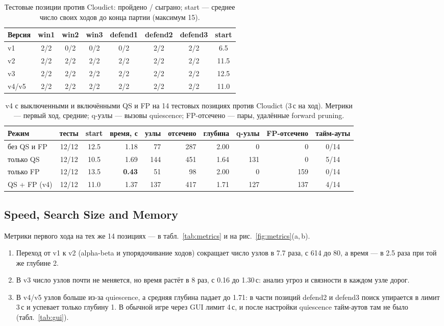 \documentclass[a4paper,10pt,twocolumn]{article}
\newenvironment{points}{\begin{enumerate}[label=(\arabic*),leftmargin=*,itemsep=2pt,topsep=3pt]}{\end{enumerate}}
\begin{document}
\begin{table}[t]
\centering
\caption{Тестовые позиции против Cloudict: пройдено / сыграно; start --- среднее число своих ходов до конца партии (максимум 15).}
\label{tab:battery}
\begin{tabular}{@{}lcccccc|c@{}}
\toprule
Версия & win1 & win2 & win3 & defend1 & defend2 & defend3 & start \\
\midrule
v1 & 2/2 & \cellcolor{red!12}0/2 & \cellcolor{red!12}0/2 & \cellcolor{red!12}0/2 & 2/2 & 2/2 & 6.5 \\
v2 & 2/2 & 2/2 & 2/2 & 2/2 & 2/2 & 2/2 & 11.5 \\
v3 & 2/2 & 2/2 & 2/2 & 2/2 & 2/2 & 2/2 & 12.5 \\
v4/v5 & 2/2 & 2/2 & 2/2 & 2/2 & 2/2 & 2/2 & 11.0 \\
\bottomrule
\end{tabular}
\end{table}

\begin{table}[t]
\centering
\caption{v4 с выключенными и включёнными QS и FP на 14 тестовых позициях против Cloudict (3\,с на ход). Метрики --- первый ход, средние; q-узлы --- вызовы quiescence; FP-отсечено --- пары, удалённые forward pruning.}
\label{tab:ablation}
\begin{tabular}{@{}lccrrrrrrc@{}}
\toprule
Режим & тесты & start & время, с & узлы & отсечено & глубина & q-узлы & FP-отсечено & тайм-ауты \\
\midrule
без QS и FP & 12/12 & 12.5 & 1.18 & 77 & 287 & 2.00 & 0 & 0 & 0/14 \\
только QS & 12/12 & 10.5 & 1.69 & 144 & 451 & 1.64 & 131 & 0 & 5/14 \\
только FP & 12/12 & 13.5 & \textbf{0.43} & 51 & 98 & 2.00 & 0 & 159 & 0/14 \\
QS + FP (v4) & 12/12 & 11.0 & 1.37 & 137 & 417 & 1.71 & 127 & 137 & 4/14 \\
\bottomrule
\end{tabular}
\end{table}

\subsection{Speed, Search Size and Memory}\label{sec:speed}
Метрики первого хода на тех же 14 позициях --- в табл.~\ref{tab:metrics} и на рис.~\ref{fig:metrics}(a,\,b).
\begin{points}
\item Переход от v1 к v2 (alpha-beta и упорядочивание ходов) сокращает число узлов в 7.7 раза, с 614 до 80, а время --- в 2.5 раза при той же глубине 2.
\item В v3 число узлов почти не меняется, но время растёт в 8 раз, с 0.16 до 1.30\,с: анализ угроз и связности в каждом узле дорог.
\item В v4/v5 узлов больше из-за quiescence, а средняя глубина падает до 1.71: в части позиций defend2 и defend3 поиск упирается в лимит 3\,с и успевает только глубину 1. В обычной игре через GUI лимит 4\,с, и после настройки quiescence тайм-аутов там не было (табл.~\ref{tab:gui}).
\end{points}
\end{document}
